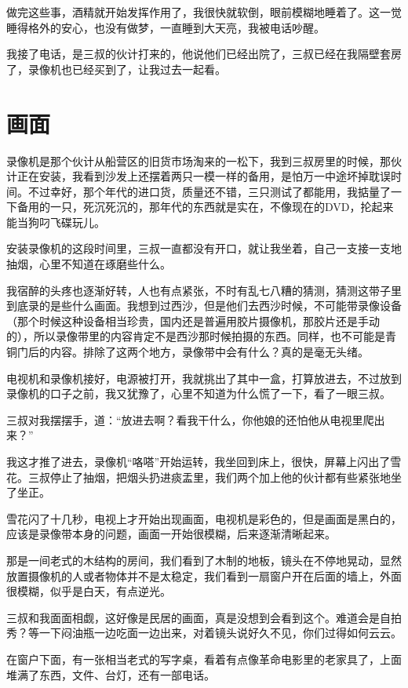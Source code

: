 做完这些事，酒精就开始发挥作用了，我很快就软倒，眼前模糊地睡着了。这一觉睡得格外的安心，也没有做梦，一直睡到大天亮，我被电话吵醒。

我接了电话，是三叔的伙计打来的，他说他们已经出院了，三叔已经在我隔壁套房了，录像机也已经买到了，让我过去一起看。

\chapter{画面}

录像机是那个伙计从船营区的旧货市场淘来的一松下，我到三叔房里的时候，那伙计正在安装，我看到沙发上还摆着两只一模一样的备用，是怕万一中途坏掉耽误时间。不过幸好，那个年代的进口货，质量还不错，三只测试了都能用，我掂量了一下备用的一只，死沉死沉的，那年代的东西就是实在，不像现在的DVD，抡起来能当狗叼飞碟玩儿。

安装录像机的这段时间里，三叔一直都没有开口，就让我坐着，自己一支接一支地抽烟，心里不知道在琢磨些什么。

我宿醉的头疼也逐渐好转，人也有点紧张，不时有乱七八糟的猜测，猜测这带子里到底录的是些什么画面。我想到过西沙，但是他们去西沙时候，不可能带录像设备（那个时候这种设备相当珍贵，国内还是普遍用胶片摄像机，那胶片还是手动的），所以录像带里的内容肯定不是西沙那时候拍摄的东西。同样，也不可能是青铜门后的内容。排除了这两个地方，录像带中会有什么？真的是毫无头绪。

电视机和录像机接好，电源被打开，我就挑出了其中一盒，打算放进去，不过放到录像机的口子之前，我又犹豫了，心里不知道为什么慌了一下，看了一眼三叔。

三叔对我摆摆手，道：“放进去啊？看我干什么，你他娘的还怕他从电视里爬出来？”

我这才推了进去，录像机“咯嗒”开始运转，我坐回到床上，很快，屏幕上闪出了雪花。三叔停止了抽烟，把烟头扔进痰盂里，我们两个加上他的伙计都有些紧张地坐了坐正。

雪花闪了十几秒，电视上才开始出现画面，电视机是彩色的，但是画面是黑白的，应该是录像带本身的问题，画面一开始很模糊，后来逐渐清晰起来。

那是一间老式的木结构的房间，我们看到了木制的地板，镜头在不停地晃动，显然放置摄像机的人或者物体并不是太稳定，我们看到一扇窗户开在后面的墙上，外面很模糊，似乎是白天，有点逆光。

三叔和我面面相觑，这好像是民居的画面，真是没想到会看到这个。难道会是自拍秀？等一下闷油瓶一边吃面一边出来，对着镜头说好久不见，你们过得如何云云。

在窗户下面，有一张相当老式的写字桌，看着有点像革命电影里的老家具了，上面堆满了东西，文件、台灯，还有一部电话。


